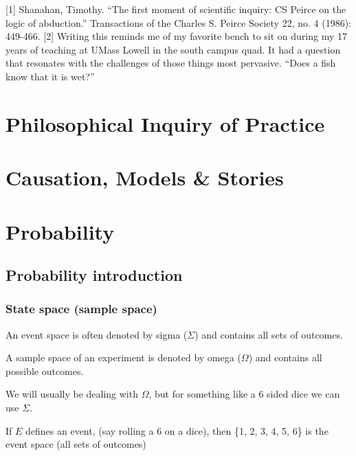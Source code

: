 \documentclass[
]{book}
\begin{document}
{[}1{]} Shanahan, Timothy. ``The first moment of scientific inquiry: CS Peirce on the logic of abduction.'' Transactions of the Charles S. Peirce Society 22, no. 4 (1986): 449-466.
{[}2{]} Writing this reminds me of my favorite bench to sit on during my 17 years of teaching at UMass Lowell in the south campus quad. It had a question that resonates with the challenges of those things most pervasive. ``Does a fish know that it is wet?''

\hypertarget{philosophical-inquiry-of-practice}{%
\chapter{Philosophical Inquiry of Practice}\label{philosophical-inquiry-of-practice}}

\hypertarget{causation-models-stories}{%
\chapter{Causation, Models \& Stories}\label{causation-models-stories}}

\hypertarget{probability}{%
\chapter{Probability}\label{probability}}

\hypertarget{probability-introduction}{%
\section{Probability introduction}\label{probability-introduction}}

\hypertarget{state-space-sample-space}{%
\subsection{State space (sample space)}\label{state-space-sample-space}}

An event space is often denoted by sigma (\(\Sigma\)) and contains all sets of outcomes.

A sample space of an experiment is denoted by omega (\(\Omega\)) and contains all possible outcomes.

We will usually be dealing with \(\Omega\), but for something like a 6 sided dice we can use \(\Sigma\).

If \(E\) defines an event, (say rolling a 6 on a dice), then \{1, 2, 3, 4, 5, 6\} is the event space (all sets of outcomes)
\end{document}
